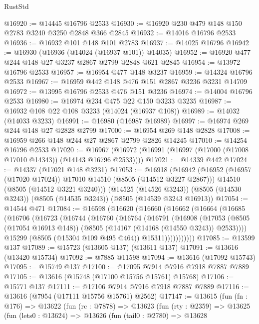 \begin{lexlean}{RustStd}
\begin{coremodule}
@16920 := @14445 @16796 @2533
@16930 := @16920 @230 @479 @148 @150 @2783 @3240 @3250 @2848 @366 @2845
@16932 := @14016 @16796 @2533
@16936 := @16932 @101 @148 @101 @2783
@16937 := @14025 @16796
@16942 := @16930 (@16936 (@14024 (@16937 @101)) @14035)
@16952 := @16920 @477 @244 @148 @27 @3237 @2867 @2799 @2848 @621 @2845
@16954 := @13972 @16796 @2533
@16957 := @16954 @477 @148 @3237
@16959 := @14324 @16796 @2533
@16967 := @16959 @442 @148 @476 @151 @2867 @3236 @3231 @14709
@16972 := @13995 @16796 @2533 @476 @151 @3236
@16974 := @14004 @16796 @2533
@16980 := @16974 @234 @475 @22 @150 @3233 @3235
@16987 := @16932 @108 @22 @108 @3233 (@14024 (@16937 @108))
@16989 := @14032 (@14033 @3233)
@16991 := @16980 (@16987 @16989)
@16997 := @16974 @269 @244 @148 @27 @2828 @2799
@17000 := @16954 @269 @148 @2828
@17008 := @16959 @266 @148 @244 @27 @2867 @2799 @2826 @14245
@17010 := @14254 @16796 @2533
@17020 := @16967 (@16972 (@16991 (@16997 (@17000 (@17008 @17010 @14343)) (@14143 @16796 @2533))))
@17021 := @14339 @442
@17024 := @14337 (@17021 @148 @3231)
@17053 := @16918
    (@16942
      (@16952 (@16957 (@17020 @17024)) @17010 @14510 (@8505 (@14512 @3227 @2867)))
      @14510
      (@8505 (@14512 @3221 @3240)))
    (@14525 (@14526 @3243))
    (@8505 (@14530 @3243))
    (@8505 (@14535 @3243))
    (@8505 (@14539 @3243 @16913))
@17054 := @14544 @471
@17084 := @16598
    (@16620
      (@16660
        (@16662
          (@16664
            (@16685
              (@16706
                (@16723
                  (@16744
                    (@16760
                      (@16764
                        (@16791
                          (@16908
                            (@17053
                              (@8505 (@17054 @16913 @148))
                              (@8505 (@14167 (@14168 (@14550 @3243)) @2533))))
                          @15299
                          (@8505 (@15304 @109 @495 @464))
                          @15311)))))))))))
@17085 := @13599 @137
@17089 := @15723 (@13605 @137) (@13611 @137)
@17091 := @13616 (@13420 @15734)
@17092 := @7885 @11598
@17094 := @13616 (@17092 @15743)
@17095 := @15749 @137
@17100 := @17095 @7914 @7916 @7918 @7887 @7889
@17105 := @13616 (@15748 (@17100 @15756 @15761) @15768)
@17106 := @15771 @137
@17111 := @17106 @7914 @7916 @7918 @7887 @7889
@17116 := @13616 (@7954 (@17111 @15756 @15761) @2562)
@17147 := @13615
    (fun (fn : @176) =>
    @13622
      (fun (rc : @7878) =>
      @13623
        (fun (rty : @2359) =>
        @13625
          (fun (lets0 : @13624) =>
          @13626
            (fun (tail0 : @2780) =>
            @13628

\end{coremodule}
\end{lexlean}
